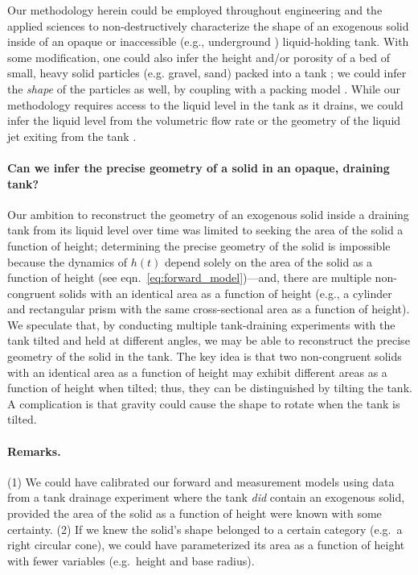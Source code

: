 \documentclass[a4paper,fleqn]{cas-dc}
\begin{document}
Our methodology herein could be employed throughout engineering and the applied sciences to non-destructively characterize the shape of an exogenous solid inside of an opaque or inaccessible (e.g., underground \cite{gephart2010short}) liquid-holding tank.
With some modification, one could also infer the height and/or porosity of a bed of small, heavy solid particles (e.g. gravel, sand) packed into a tank \cite{guellouz2020estimation}; we could infer the \emph{shape} of the particles as well, by coupling with a packing model \cite{zhang2006relationship}. 
While our methodology requires access to the liquid level in the tank as it drains, we could infer the liquid level from the volumetric flow rate or the geometry of the liquid jet exiting from the tank \cite{groetsch1999inverse,davidovic2020visualizing}.



\paragraph{Can we infer the precise geometry of a solid in an opaque, draining tank?}
Our ambition to reconstruct the geometry of an exogenous solid inside a draining tank from its liquid level over time was limited to seeking the area of the solid a function of height; determining the precise geometry of the solid is impossible because the dynamics of $h(t)$ depend solely on the area of the solid as a function of height (see eqn.~\ref{eq:forward_model})---and, there are multiple non-congruent solids with an identical area as a function of height (e.g., a cylinder and rectangular prism with the same cross-sectional area as a function of height). We speculate that, by conducting multiple tank-draining experiments with the tank tilted and held at different angles, we may be able to reconstruct the precise geometry of the solid in the tank. The key idea is that two non-congruent solids with an identical area as a function of height may exhibit different areas as a function of height when tilted; thus, they can be distinguished by tilting the tank. A complication is that gravity could cause the shape to rotate when the tank is tilted. 


\paragraph{Remarks.} (1) We could have calibrated our forward and measurement models using data from a tank drainage experiment where the tank \emph{did} contain an exogenous solid, provided the area of the solid as a function of height were known with some certainty. (2) If we knew the solid's shape belonged to a certain category (e.g.\ a right circular cone), we could have parameterized its area as a function of height with fewer variables (e.g.\ height and base radius). 
\end{document}

